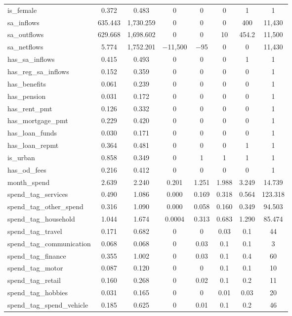 \begin{table}[!htbp]
\begin{tabular}{@{\extracolsep{5pt}}lccccccc}
is\_female & 0.372 & 0.483 & 0 & 0 & 0 & 1 & 1 \\ 
sa\_inflows & 635.443 & 1,730.259 & 0 & 0 & 0 & 400 & 11,430 \\ 
sa\_outflows & 629.668 & 1,698.602 & 0 & 0 & 10 & 454.2 & 11,500 \\ 
sa\_netflows & 5.774 & 1,752.201 & $-$11,500 & $-$95 & 0 & 0 & 11,430 \\ 
has\_sa\_inflows & 0.415 & 0.493 & 0 & 0 & 0 & 1 & 1 \\ 
has\_reg\_sa\_inflows & 0.152 & 0.359 & 0 & 0 & 0 & 0 & 1 \\ 
has\_benefits & 0.061 & 0.239 & 0 & 0 & 0 & 0 & 1 \\ 
has\_pension & 0.031 & 0.172 & 0 & 0 & 0 & 0 & 1 \\ 
has\_rent\_pmt & 0.126 & 0.332 & 0 & 0 & 0 & 0 & 1 \\ 
has\_mortgage\_pmt & 0.229 & 0.420 & 0 & 0 & 0 & 0 & 1 \\ 
has\_loan\_funds & 0.030 & 0.171 & 0 & 0 & 0 & 0 & 1 \\ 
has\_loan\_repmt & 0.364 & 0.481 & 0 & 0 & 0 & 1 & 1 \\ 
is\_urban & 0.858 & 0.349 & 0 & 1 & 1 & 1 & 1 \\ 
has\_od\_fees & 0.216 & 0.412 & 0 & 0 & 0 & 0 & 1 \\ 
month\_spend & 2.639 & 2.240 & 0.201 & 1.251 & 1.988 & 3.249 & 14.739 \\ 
spend\_tag\_services & 0.490 & 1.086 & 0.000 & 0.169 & 0.318 & 0.564 & 123.318 \\ 
spend\_tag\_other\_spend & 0.316 & 1.090 & 0.000 & 0.058 & 0.160 & 0.349 & 94.503 \\ 
spend\_tag\_household & 1.044 & 1.674 & 0.0004 & 0.313 & 0.683 & 1.290 & 85.474 \\ 
spend\_tag\_travel & 0.171 & 0.682 & 0 & 0 & 0.03 & 0.1 & 44 \\ 
spend\_tag\_communication & 0.068 & 0.068 & 0 & 0.03 & 0.1 & 0.1 & 3 \\ 
spend\_tag\_finance & 0.355 & 1.002 & 0 & 0.03 & 0.1 & 0.4 & 60 \\ 
spend\_tag\_motor & 0.087 & 0.120 & 0 & 0 & 0.1 & 0.1 & 10 \\ 
spend\_tag\_retail & 0.160 & 0.268 & 0 & 0.02 & 0.1 & 0.2 & 11 \\ 
spend\_tag\_hobbies & 0.031 & 0.165 & 0 & 0 & 0.01 & 0.03 & 20 \\ 
spend\_tag\_spend\_vehicle & 0.185 & 0.625 & 0 & 0.01 & 0.1 & 0.2 & 46 \\ 

\end{tabular}
\end{table}
